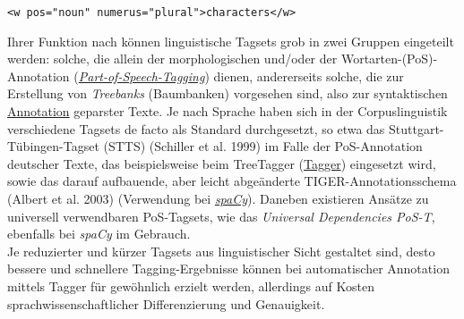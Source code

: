 \documentclass{article}
\begin{document}
        \begin{verbatim}<w pos="noun" numerus="plural">characters</w>\end{verbatim}Ihrer Funktion nach können linguistische Tagsets grob in zwei Gruppen eingeteilt
                  werden: solche, die allein der morphologischen und/oder der
                  Wortarten-(PoS)-Annotation (\emph{\href{http://gams.uni-graz.at/o:konde.156}{Part-of-Speech-Tagging}}) dienen, andererseits solche, die zur Erstellung von \emph{Treebanks} (Baumbanken) vorgesehen sind, also zur syntaktischen \href{http://gams.uni-graz.at/o:konde.17}{Annotation} geparster Texte. Je nach
                  Sprache haben sich in der Corpuslinguistik verschiedene Tagsets de facto als
                  Standard durchgesetzt, so etwa das Stuttgart-Tübingen-Tagset (STTS)
                     (Schiller et al. 1999) im Falle der PoS-Annotation deutscher
                  Texte, das beispielsweise beim TreeTagger (\href{http://gams.uni-graz.at/o:konde.176}{Tagger}) eingesetzt wird, sowie das darauf
                  aufbauende, aber leicht abgeänderte TIGER-Annotationsschema (Albert et al.
                     2003) (Verwendung bei \emph{\href{http://gams.uni-graz.at/o:konde.170}{spaCy}}). Daneben existieren Ansätze zu universell verwendbaren PoS-Tagsets, wie das
                     \emph{Universal Dependencies PoS-T}, ebenfalls bei \emph{spaCy} im Gebrauch.\\
            
        Je reduzierter und kürzer Tagsets aus linguistischer Sicht gestaltet sind, desto
                  bessere und schnellere Tagging-Ergebnisse können bei automatischer Annotation
                  mittels Tagger für gewöhnlich erzielt werden, allerdings auf Kosten
                  sprachwissenschaftlicher Differenzierung und Genauigkeit.\\
            
\end{document}
